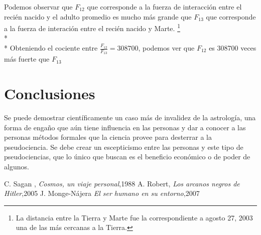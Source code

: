 \documentclass[a4paper,11pt]{article}
\begin{document}
Podemos observar que $F_{12}$ que corresponde a la fuerza de interacci\'on entre el reci\'en nacido y el adulto promedio es
mucho m\'as grande que $F_{13}$ que corresponde a la fuerza de interaci\'on entre el reci\'en nacido y Marte.
\footnote{La distancia entre la Tierra y Marte fue la correspondiente a agosto 27, 2003 una de las m\'as cercanas a la Tierra.}\\* \\*
Obteniendo el cociente entre $\frac{F_{12}}{F_{13}} = 308700$, podemos ver que $F_{12}$ es 308700 veces m\'as fuerte 
que $F_{13}$

\section{Conclusiones}
Se puede demostrar cient\'ificamente un caso m\'as de invalidez de la astrolog\'ia, una forma de engaño que a\'un tiene influencia en las personas y dar a conocer a las personas m\'etodos formales que la ciencia provee para desterrar a la pseudociencia. 
Se debe crear un escepticismo entre las personas y este tipo de pseudociencias, que lo \'unico que buscan es el beneficio econ\'omico o de poder de algunos.
\begin{thebibliography}{2}
  C. Sagan , \emph{Cosmos, un viaje personal},1988
 A. Robert, \emph{Los arcanos negros de Hitler},2005
 J. Monge-N\'ajera \emph{El ser humano en su entorno},2007
\end{thebibliography}
\end{document}
